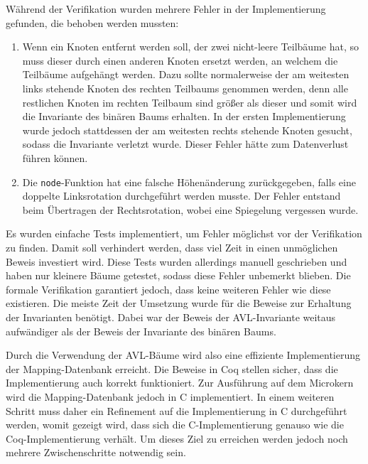 \documentclass[a4paper, parskip]{scrartcl}
\begin{document}
Während der Verifikation wurden mehrere Fehler in der Implementierung gefunden, die behoben werden mussten:
\begin{enumerate}
\item Wenn ein Knoten entfernt werden soll, der zwei nicht-leere Teilbäume hat, so muss dieser durch einen anderen Knoten ersetzt werden, an welchem die Teilbäume aufgehängt werden.
Dazu sollte normalerweise der am weitesten links stehende Knoten des rechten Teilbaums genommen werden, denn alle restlichen Knoten im rechten Teilbaum sind größer als dieser und somit wird die Invariante des binären Baums erhalten. 
In der ersten Implementierung wurde jedoch stattdessen der am weitesten rechts stehende Knoten gesucht, sodass die Invariante verletzt wurde. Dieser Fehler hätte zum Datenverlust führen können.
\item Die \verb|node|-Funktion hat eine falsche Höhenänderung zurückgegeben, falls eine doppelte Linksrotation durchgeführt werden musste. Der Fehler entstand beim Übertragen der Rechtsrotation, wobei eine Spiegelung vergessen wurde.
\end{enumerate}
Es wurden einfache Tests implementiert, um Fehler möglichst vor der Verifikation zu finden.
Damit soll verhindert werden, dass viel Zeit in einen unmöglichen Beweis investiert wird.
Diese Tests wurden allerdings manuell geschrieben und haben nur kleinere Bäume getestet, sodass diese Fehler unbemerkt blieben.
Die formale Verifikation garantiert jedoch, dass keine weiteren Fehler wie diese existieren.
Die meiste Zeit der Umsetzung wurde für die Beweise zur Erhaltung der Invarianten benötigt.
Dabei war der Beweis der AVL-Invariante weitaus aufwändiger als der Beweis der Invariante des binären Baums.

Durch die Verwendung der AVL-Bäume wird also eine effiziente Implementierung der Mapping-Datenbank erreicht. 
Die Beweise in Coq stellen sicher, dass die Implementierung auch korrekt funktioniert.
Zur Ausführung auf dem Microkern wird die Mapping-Datenbank jedoch in C implementiert.
In einem weiteren Schritt muss daher ein Refinement auf die Implementierung in C durchgeführt werden, womit gezeigt wird, dass sich die C-Implementierung genauso wie die Coq-Implementierung verhält.
Um dieses Ziel zu erreichen werden jedoch noch mehrere Zwischenschritte notwendig sein.

\newpage
\raggedright
\printbibliography[heading=bibnumbered]

\newpage
\end{document}
